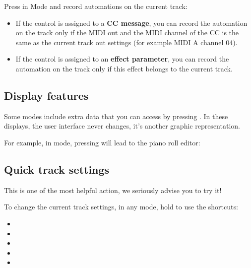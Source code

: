 
Press  in  Mode and record automations on the current track:

\begin{itemize}
\item If the control is assigned to a \textbf{CC message}, you can record the automation on the track only if the MIDI out and the MIDI channel of the CC is the same as the current track out settings (for example MIDI A channel 04).
\item If the control is assigned to an \textbf{effect parameter}, you can record the automation on the track only if this effect belongs to the current track.
\end{itemize}



\subsection{Display features}

Some modes include extra data that you can access by pressing . In these displays, the user interface never changes, it's another graphic representation.

For example, in  mode, pressing  will lead to the piano roll editor:




\subsection{Quick track settings}

This is one of the most helpful action, we seriously advise you to try it!

To change the current track settings, in any mode, hold  to use the shortcuts:

\begin{itemize}
\item {}
\item {}
\item {}
\item {}
\item {}
\end{itemize}

